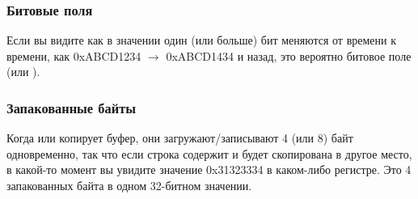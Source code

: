 \subsubsection{Битовые поля}

Если вы видите как в значении один (или больше) бит меняются от времени к времени, как 0xABCD1234 $\rightarrow$ 0xABCD1434 и назад,
это вероятно битовое поле (или ).

\subsubsection{Запакованные байты}

Когда  или  копирует буфер, они загружают/записывают 4 (или 8) байт одновременно,
так что если строка содержит  и будет скопирована в другое место,
в какой-то момент вы увидите значение 0x31323334 в каком-либо регистре.
Это 4 запакованных байта в одном 32-битном значении.

